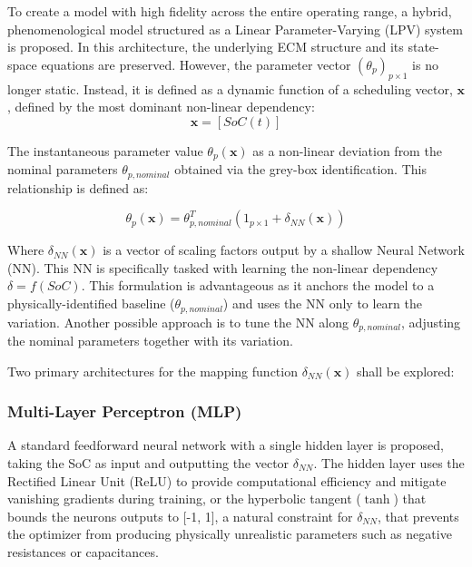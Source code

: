 \documentclass[lettersize,journal]{IEEEtran}
\begin{document}
To create a model with high fidelity across the entire operating range, a hybrid, phenomenological model structured as a Linear Parameter-Varying (LPV) system is proposed. In this architecture, the underlying ECM structure and its state-space equations are preserved. However, the parameter vector $(\theta_p)_{p\times 1}$ is no longer static. Instead, it is defined as a dynamic function of a scheduling vector, $\mathbf{x}$, defined by the most dominant non-linear dependency:
\begin{equation}
	\label{eq:scheduling_vector}
	\mathbf{x} = [SoC(t)]
\end{equation}

The instantaneous parameter value $\theta_p(\mathbf{x})$ as a non-linear deviation from the nominal parameters $\theta_{p, nominal}$ obtained via the grey-box identification. This relationship is defined as:

\begin{equation}
	\label{eq:lpv_param}
	\theta_p(\mathbf{x}) = \theta_{p, nominal}^T(1_{p\times 1} + \delta_{NN}(\mathbf{x}))
\end{equation}

Where $\delta_{NN}(\mathbf{x})$ is a vector of scaling factors output by a shallow Neural Network (NN). This NN is specifically tasked with learning the non-linear dependency $\delta = f(SoC)$. This formulation is advantageous as it anchors the model to a physically-identified baseline ($\theta_{p, nominal}$) and uses the NN only to learn the variation. Another possible approach is to tune the NN along $\theta_{p, nominal}$, adjusting the nominal parameters together with its variation.

Two primary architectures for the mapping function $\delta_{NN}(\mathbf{x})$ shall be explored:

\subsubsection{Multi-Layer Perceptron (MLP)}

A standard feedforward neural network with a single hidden layer is proposed, taking the SoC as input and outputting the vector $\delta_{NN}$. The hidden layer uses the Rectified Linear Unit (ReLU) to provide computational efficiency and mitigate vanishing gradients during training, or the hyperbolic tangent ($\tanh$) that bounds the neurons outputs to [-1, 1], a natural constraint for $\delta_{NN}$, that prevents the optimizer from producing physically unrealistic parameters such as negative resistances or capacitances.
\end{document}
